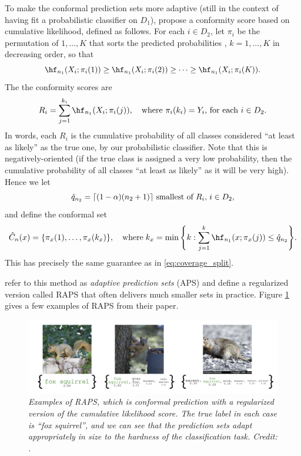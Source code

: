 \documentclass{article}
\begin{document}
To make the conformal prediction sets more adaptive (still in the context of
having fit a probabilistic classifier  on $D_1$),
\citet{romano2020classification} propose a conformity score based on cumulative
likelihood, defined as follows. For each $i \in D_2$, let $\pi_i$ be the
permutation of $1,\ldots,K$ that sorts the predicted probabilities
, $k=1,\dots,K$ in decreasing order, so that  
\[
\hf_{n_1}(X_i; \pi_i(1)) \geq \hf_{n_1}(X_i; \pi_i(2)) \geq \cdots \geq 
\hf_{n_1}(X_i; \pi_i(K)). 
\]
The the conformity scores are 
\[
R_i = \sum_{j=1}^{k_i} \hf_{n_1}(X_i; \pi_i(j)), \quad \text{where $\pi_i(k_i) =
  Y_i$, for each $i \in D_2$}.
\]
In words, each $R_i$ is the cumulative probability of all classes considered
``at least as likely'' as the true one, by our probabilistic classifier. Note
that this is negatively-oriented (if the true class is assigned a very low
probability, then the cumulative probability of all classes ``at least as
likely'' as it will be very high). Hence we let
\[
\text{$\hat{q}_{n_2} = \lceil (1-\alpha)(n_2+1) \rceil$ smallest of $R_i$, $i \in 
  D_2$},  
\]
and define the conformal set
\[
\hC_n(x) = \{ \pi_x(1), \ldots, \pi_x(k_x) \}, \quad \text{where} \; 
k_x =  \min\Bigg\{ k : \sum_{j=1}^k \hf_{n_1}(x; \pi_x(j)) \leq \hq_{n_2} 
\Bigg\}.
\]
This has precisely the same guarantee as in \eqref{eq:coverage_split}.

\citet{angelopoulos2021uncertainty} refer to this method as \emph{adaptive
  prediction sets} (APS) and define a regularized version called RAPS that often
delivers much smaller sets in practice. Figure \ref{fig:raps} gives a few
examples of RAPS from their paper.

\begin{figure}[htb]
\centering
\includegraphics[width=\textwidth]{raps.png}
\caption{\it Examples of RAPS, which is conformal prediction with a regularized
  version of the cumulative likelihood score. The true label in each case is
  ``fox squirrel'', and we can see that the prediction sets adapt appropriately
  in size to the hardness of the classification task. Credit:
  \citet{angelopoulos2021uncertainty}.} 
\label{fig:raps}
\end{figure}



\end{document}
